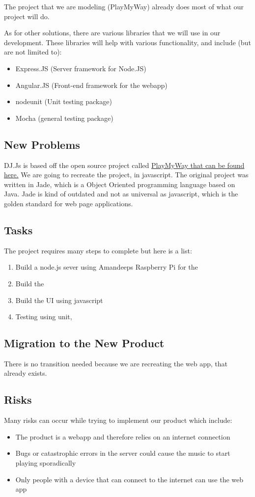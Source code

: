 \documentclass[12pt, titlepage]{article}
\begin{document}
The project that we are modeling (PlayMyWay) already does most of what our
project will do.

As for other solutions, there are various libraries that we will use in our
development. These libraries will help with various functionality, and include
(but are not limited to):
\begin{itemize}
\item Express.JS (Server framework for Node.JS)
\item Angular.JS (Front-end framework for the webapp)
\item nodeunit (Unit testing package)
\item Mocha (general testing package)
\end{itemize}
\subsection{New Problems}
DJ.Js is based off the open source project called \href{https://github.com/malithsen/playmyway}{PlayMyWay that can be found here.} We are going to recreate the project, in javascript. The original project was written in Jade, which is a Object Oriented programming language based on Java. Jade is kind of outdated and not as universal as javascript, which is the golden standard for web page applications.
\subsection{Tasks}
The project requires many steps to complete but here is a list:
\begin{enumerate}
\item Build a node.js sever using Amandeeps Raspberry Pi for the 
\item Build the 
\item Build the UI using javascript
\item Testing using unit, 
\end{enumerate}
\subsection{Migration to the New Product}
There is no transition needed because we are recreating the web app, that already exists.
\subsection{Risks}
Many risks can occur while trying to implement our product which include:
\begin{itemize}
\item The product is a webapp and therefore relies on an internet connection
\item Bugs or catastrophic errors in the server could cause the music to start playing sporadically
\item Only people with a device that can connect to the internet can use the web app
\end{itemize} 
\end{document}
